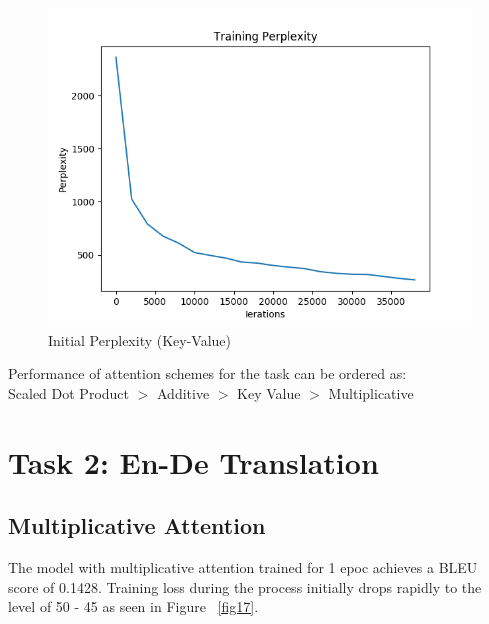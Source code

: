 \documentclass[11pt,a4paper]{article}
\begin{document}
\begin{figure}[!htbp]
\includegraphics[width=\linewidth]{hi_key-value_ppl_1.png}
\caption{Initial Perplexity (Key-Value)}
\label{fig15}
\end{figure}


Performance of attention schemes for the task can be ordered as: \\
Scaled Dot Product $>$ Additive $>$ Key Value $>$ Multiplicative  


\section{Task 2: En-De Translation}

\subsection{Multiplicative Attention}
The model with multiplicative attention trained for 1 epoc achieves a BLEU score of 0.1428.
Training loss during the process initially drops rapidly to the level of 50 - 45 as seen in Figure ~\ref{fig17}. 
\end{document}
